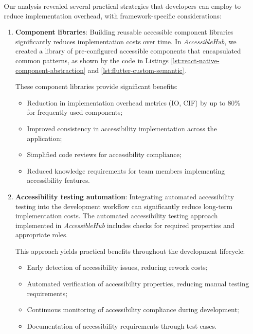 Our analysis revealed several practical strategies that developers can employ to reduce implementation overhead, with framework-specific considerations:

\begin{enumerate}
    \item \textbf{Component libraries}: Building reusable accessible component libraries significantly reduces implementation costs over time. In \textit{AccessibleHub}, we created a library of pre-configured accessible components that encapsulated common patterns, as shown by the code in Listings \ref{lst:react-native-component-abstraction} and \ref{lst:flutter-custom-semantic}.

    These component libraries provide significant benefits:
    \begin{itemize}
        \item Reduction in implementation overhead metrics (IO, CIF) by up to 80\% for frequently used components;
        \item Improved consistency in accessibility implementation across the application;
        \item Simplified code reviews for accessibility compliance;
        \item Reduced knowledge requirements for team members implementing accessibility features.
    \end{itemize}
    
    \item \textbf{Accessibility testing automation}: Integrating automated accessibility testing into the development workflow can significantly reduce long-term implementation costs. The automated accessibility testing approach implemented in \textit{AccessibleHub} includes checks for required properties and appropriate roles.
    
    This approach yields practical benefits throughout the development lifecycle:
    \begin{itemize}
        \item Early detection of accessibility issues, reducing rework costs;
        \item Automated verification of accessibility properties, reducing manual testing requirements;
        \item Continuous monitoring of accessibility compliance during development;
        \item Documentation of accessibility requirements through test cases.
    \end{itemize}
    

\end{enumerate}
